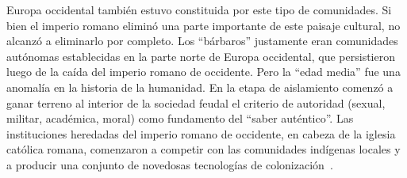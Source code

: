 \documentclass[a4paper,10pt]{book}
\begin{document}

Europa occidental también estuvo constituida por este tipo de comunidades.
Si bien el imperio romano eliminó una parte importante de este paisaje cultural, no alcanzó a eliminarlo por completo.
Los ``bárbaros'' justamente eran comunidades autónomas establecidas en la parte norte de Europa occidental, que persistieron luego de la caída del imperio romano de occidente.
Pero la ``edad media'' fue una anomalía en la historia de la humanidad.
En la etapa de aislamiento comenzó a ganar terreno al interior de la sociedad feudal el criterio de autoridad (sexual, militar, académica, moral) como fundamento del ``saber auténtico''.
Las instituciones heredadas del imperio romano de occidente, en cabeza de la iglesia católica romana, comenzaron a competir con las comunidades indígenas locales y a producir una conjunto de novedosas tecnologías de colonización~\cite{zaffaroni2013-cuestionCriminal}. 

\end{document}
